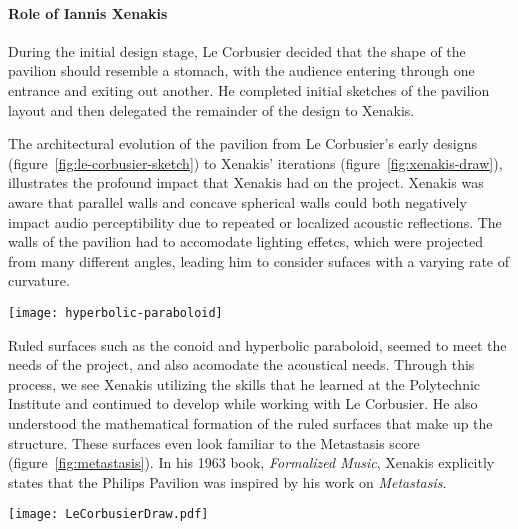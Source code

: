 \paragraph{Role of Iannis Xenakis} During the initial design stage, Le
Corbusier decided that the shape of the pavilion should resemble a
stomach, with the audience entering through one entrance and exiting
out another. He completed initial sketches of the pavilion layout and
then delegated the remainder of the design to
Xenakis.\cite{Clarke2012}

The architectural evolution of the pavilion from Le Corbusier's early
designs (figure~\ref{fig:le-corbusier-sketch}) to Xenakis' iterations
(figure~\ref{fig:xenakis-draw}), illustrates the profound impact that
Xenakis had on the project. Xenakis was aware that parallel walls and
concave spherical walls could both negatively impact audio
perceptibility due to repeated or localized acoustic reflections. The
walls of the pavilion had to accomodate lighting effetcs, which were
projected from many different angles, leading him to consider sufaces
with a varying rate of curvature.\cite{philips1958}
  \begin{marginfigure}
    \texttt{[image: hyperbolic-paraboloid]}
    \caption{A ruled surface. For a surface to be considered ``ruled''
      every point on the surface must be on a straight line, and that
      line must lie on the surface. In Xenakis' time, ruled surfaces
      were useful in architecture, because they simplified the
      construction of curved surfaces by using straight beams.}
    \label{fig:ruled-surface}
  \end{marginfigure}
Ruled surfaces such as the conoid and hyperbolic paraboloid, seemed to
meet the needs of the project, and also acomodate the acoustical needs.
Through this process, we see Xenakis utilizing the skills that he
learned at the Polytechnic Institute and continued to develop while
working with Le Corbusier. He also understood the mathematical
formation of the ruled surfaces that make up the structure. These
surfaces even look familiar to the Metastasis score
(figure~\ref{fig:metastasis}). In his 1963 book, \textit{Formalized
  Music}, Xenakis explicitly states that the Philips Pavilion was
inspired by his work on \textit{Metastasis}.

\begin{figure*}[]
  \texttt{[image: LeCorbusierDraw.pdf]}
  \caption{Le Corbusier's design sketches for the Philips Pavilion,
    September \textendash{} October, 1956 (\textcircled{c} 2012
    Artists Rights Society, New York/ADAGP, Paris/FLC)}
  \label{fig:le-corbusier-sketch}
\end{figure*}

